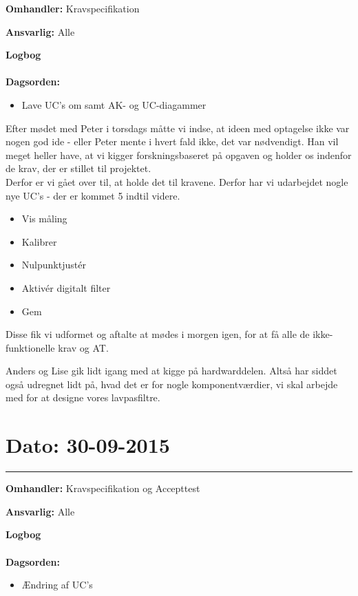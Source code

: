 \textbf{Omhandler:} Kravspecifikation 

\textbf{Ansvarlig:} Alle 

\textbf{Logbog}
\\
\\
\textbf{Dagsorden:}
\begin{itemize}
\item Lave UC's om samt AK- og UC-diagammer
\end{itemize}

Efter mødet med Peter i torsdags måtte vi indse, at ideen med optagelse ikke var nogen god ide - eller Peter mente i hvert fald ikke, det var nødvendigt. Han vil meget heller have, at vi kigger forskningsbaseret på opgaven og holder os indenfor de krav, der er stillet til projektet.\\
Derfor er vi gået over til, at holde det til kravene. Derfor har vi udarbejdet nogle nye UC's - der er kommet 5 indtil videre. 
\begin{itemize}
	\item Vis måling 
	\item Kalibrer
	\item Nulpunktjustér 
	\item Aktivér digitalt filter
	\item Gem 
\end{itemize}

Disse fik vi udformet og aftalte at mødes i morgen igen, for at få alle de ikke-funktionelle krav og AT. 

Anders og Lise gik lidt igang med at kigge på hardwarddelen. Altså har siddet også udregnet lidt på, hvad det er for nogle komponentværdier, vi skal arbejde med for at designe vores lavpasfiltre.  


	
\section{Dato: 30-09-2015 }
\hrule

\textbf{Omhandler:} Kravspecifikation og Accepttest  

\textbf{Ansvarlig:} Alle 

\textbf{Logbog}
\\
\\
\textbf{Dagsorden:}
\begin{itemize}
\item Ændring af UC's
\end{itemize}
	
